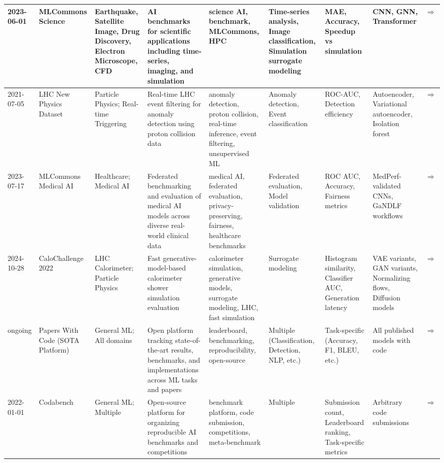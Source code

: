 \begin{landscape}
\begin{longtable}{|p{2cm}|p{2cm}|p{2cm}|p{2cm}|p{2cm}|p{2cm}|p{2cm}|p{2cm}|p{2cm}|}
2023-06-01 & MLCommons Science & Earthquake, Satellite Image, Drug Discovery, Electron Microscope, CFD & AI benchmarks for scientific applications including time-series, imaging, and simulation & science AI, benchmark, MLCommons, HPC & Time-series analysis, Image classification, Simulation surrogate modeling & MAE, Accuracy, Speedup vs simulation & CNN, GNN, Transformer & \cite{mlcommons_science2023}\href{https://github.com/mlcommons/science}{$\Rightarrow$} \\ \hline
2021-07-05 & LHC New Physics Dataset & Particle Physics; Real-time Triggering & Real-time LHC event filtering for anomaly detection using proton collision data & anomaly detection, proton collision, real-time inference, event filtering, unsupervised ML & Anomaly detection, Event classification & ROC-AUC, Detection efficiency & Autoencoder, Variational autoencoder, Isolation forest & \cite{govorkova2022lhcnewphysics}\href{https://arxiv.org/pdf/2107.02157}{$\Rightarrow$} \\ \hline
2023-07-17 & MLCommons Medical AI & Healthcare; Medical AI & Federated benchmarking and evaluation of medical AI models across diverse real-world clinical data & medical AI, federated evaluation, privacy-preserving, fairness, healthcare benchmarks & Federated evaluation, Model validation & ROC AUC, Accuracy, Fairness metrics & MedPerf-validated CNNs, GaNDLF workflows & \cite{karargyris2023federated}\href{https://github.com/mlcommons/medical}{$\Rightarrow$} \\ \hline
2024-10-28 & CaloChallenge 2022 & LHC Calorimeter; Particle Physics & Fast generative-model-based calorimeter shower simulation evaluation & calorimeter simulation, generative models, surrogate modeling, LHC, fast simulation & Surrogate modeling & Histogram similarity, Classifier AUC, Generation latency & VAE variants, GAN variants, Normalizing flows, Diffusion models & \cite{krause2024calochallenge}\href{http://arxiv.org/abs/2410.21611}{$\Rightarrow$} \\ \hline
ongoing & Papers With Code (SOTA Platform) & General ML; All domains & Open platform tracking state-of-the-art results, benchmarks, and implementations across ML tasks and papers & leaderboard, benchmarking, reproducibility, open-source & Multiple (Classification, Detection, NLP, etc.) & Task-specific (Accuracy, F1, BLEU, etc.) & All published models with code & \cite{pwc2025}\href{https://paperswithcode.com/sota}{$\Rightarrow$} \\ \hline
2022-01-01 & Codabench & General ML; Multiple & Open-source platform for organizing reproducible AI benchmarks and competitions & benchmark platform, code submission, competitions, meta-benchmark & Multiple & Submission count, Leaderboard ranking, Task-specific metrics & Arbitrary code submissions & \cite{xu2021codabench}\href{https://www.codabench.org/}{$\Rightarrow$} \\ \hline

\end{longtable}
\end{landscape}
